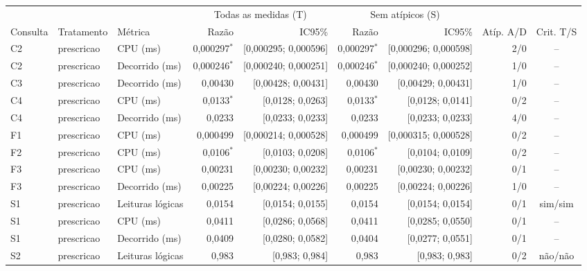 {\scriptsize\setlength{\tabcolsep}{4pt}
\begin{tabular}{lllrrrrrc}
\toprule
 &  &  & \multicolumn{2}{c}{Todas as medidas (T)} & \multicolumn{2}{c}{Sem atípicos (S)} &  &  \\
\cmidrule(lr){4-5}\cmidrule(lr){6-7}
Consulta & Tratamento & Métrica & Razão & IC95\% & Razão & IC95\% & Atíp. A/D & Crit. T/S \\
\midrule
C2 & prescricao & CPU (ms) & 0,000297$^{*}$ & [0,000295; 0,000596] & 0,000297$^{*}$ & [0,000296; 0,000598] & 2/0 & -- \\
C2 & prescricao & Decorrido (ms) & 0,000246$^{*}$ & [0,000240; 0,000251] & 0,000246$^{*}$ & [0,000240; 0,000252] & 1/0 & -- \\
C3 & prescricao & Decorrido (ms) & 0,00430 & [0,00428; 0,00431] & 0,00430 & [0,00429; 0,00431] & 1/0 & -- \\
C4 & prescricao & CPU (ms) & 0,0133$^{*}$ & [0,0128; 0,0263] & 0,0133$^{*}$ & [0,0128; 0,0141] & 0/2 & -- \\
C4 & prescricao & Decorrido (ms) & 0,0233 & [0,0233; 0,0233] & 0,0233 & [0,0233; 0,0233] & 4/0 & -- \\
F1 & prescricao & CPU (ms) & 0,000499 & [0,000214; 0,000528] & 0,000499 & [0,000315; 0,000528] & 0/2 & -- \\
F2 & prescricao & CPU (ms) & 0,0106$^{*}$ & [0,0103; 0,0208] & 0,0106$^{*}$ & [0,0104; 0,0109] & 0/2 & -- \\
F3 & prescricao & CPU (ms) & 0,00231 & [0,00230; 0,00232] & 0,00231 & [0,00230; 0,00232] & 0/1 & -- \\
F3 & prescricao & Decorrido (ms) & 0,00225 & [0,00224; 0,00226] & 0,00225 & [0,00224; 0,00226] & 1/0 & -- \\
S1 & prescricao & Leituras lógicas & 0,0154 & [0,0154; 0,0155] & 0,0154 & [0,0154; 0,0154] & 0/1 & sim/sim \\
S1 & prescricao & CPU (ms) & 0,0411 & [0,0286; 0,0568] & 0,0411 & [0,0285; 0,0550] & 0/1 & -- \\
S1 & prescricao & Decorrido (ms) & 0,0409 & [0,0280; 0,0582] & 0,0404 & [0,0277; 0,0551] & 0/1 & -- \\
S2 & prescricao & Leituras lógicas & 0,983 & [0,983; 0,984] & 0,983 & [0,983; 0,983] & 0/2 & não/não \\

\end{tabular}}
